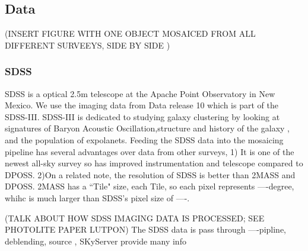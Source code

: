 \documentclass[5p]{elsarticle}
\begin{document}
\subsection{Data}
(INSERT FIGURE WITH ONE OBJECT MOSAICED FROM ALL DIFFERENT SURVEEYS, SIDE BY SIDE )
	\subsubsection{SDSS}
	SDSS is a optical 
	2.5m telescope at the Apache Point Observatory in New Mexico. We use the imaging data from Data release 10 which is part of the SDSS-III. SDSS-III is dedicated to studying galaxy clustering by looking at signatures of Baryon Acoustic Oscillation,structure and history of the galaxy , and the population of expolanets. Feeding the SDSS data into the mosaicing pipeline has several advantages over data from other surveys, 
1) It is  one of the newest all-sky survey so has improved instrumentation and telescope compared to DPOSS. 
2)On a related note, the resolution of SDSS is better than 2MASS and DPOSS.  2MASS has a ``Tile" size, each Tile, so each pixel represents ----degree, whihc is much larger than  SDSS's pixel size of ----. 
	
(TALK ABOUT HOW SDSS IMAGING DATA IS PROCESSED; SEE PHOTOLITE PAPER LUTPON) 	 The SDSS data is pass through ----pipline, deblending, source , 
	SKyServer provide many info
\end{document}
